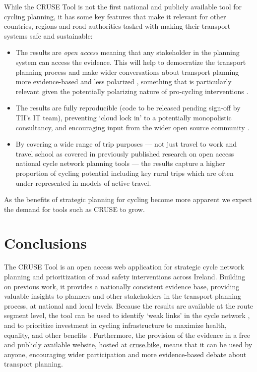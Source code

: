 \documentclass[
  super,
  preprint,
  3p]{elsarticle}
\providecommand{\tightlist}{%
  \setlength{\itemsep}{0pt}\setlength{\parskip}{0pt}}\usepackage{longtable,booktabs,array}
\begin{document}
While the CRUSE Tool is not the first national and publicly available
tool for cycling planning, it has some key features that make it
relevant for other countries, regions and road authorities tasked with
making their transport systems safe and sustainable:

\begin{itemize}
\tightlist
\item
  The results are \emph{open access} meaning that any stakeholder in the
  planning system can access the evidence. This will help to democratize
  the transport planning process and make wider conversations about
  transport planning more evidence-based and less polarized
  \citep{lovelace2020}, something that is particularly relevant given
  the potentially polarizing nature of pro-cycling interventions
  \citep{wild2017}.
\item
  The results are fully reproducible (code to be released pending
  sign-off by TII's IT team), preventing `cloud lock in' to a
  potentially monopolistic consultancy, and encouraging input from the
  wider open source community \citep{lovelace2021, dhir2017}.
\item
  By covering a wide range of trip purposes --- not just travel to work
  \citep{lovelace2017, heinen2010} and travel school \citep{goodman2019}
  as covered in previously published research on open access national
  cycle network planning tools --- the results capture a higher
  proportion of cycling potential including key rural trips which are
  often under-represented in models of active travel.
\end{itemize}

As the benefits of strategic planning for cycling become more apparent
\citep{scappini2022} we expect the demand for tools such as CRUSE to
grow.

\hypertarget{sec-conclusions}{%
\section{Conclusions}\label{sec-conclusions}}

The CRUSE Tool is an open access web application for strategic cycle
network planning and prioritization of road safety interventions across
Ireland. Building on previous work, it provides a nationally consistent
evidence base, providing valuable insights to planners and other
stakeholders in the transport planning process, at national and local
levels. Because the results are available at the route segment level,
the tool can be used to identify `weak links' in the cycle network
\citep{vybornova2022}, and to prioritize investment in cycling
infrastructure to maximize health, equality, and other benefits
\citep{mahfouz, woodcock2021}. Furthermore, the provision of the
evidence in a free and publicly available website, hosted at
\href{https://cruse.bike}{cruse.bike}, means that it can be used by
anyone, encouraging wider participation and more evidence-based debate
about transport planning.
\end{document}
